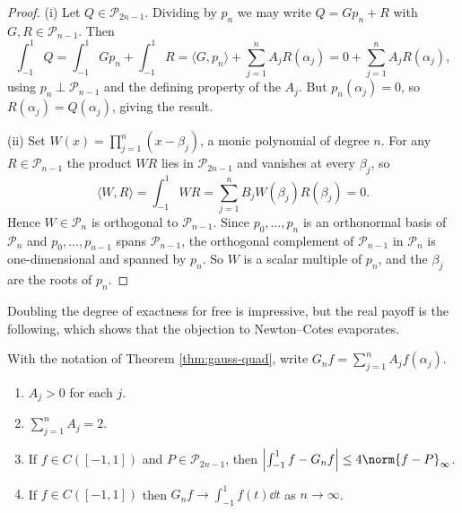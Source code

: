 \documentclass[a4paper]{scrartcl}
\newcommand{\Pn}{\mathcal{P}}
\begin{document}
\begin{proof}
	(i) Let $Q\in\Pn_{2n-1}$. Dividing by $p_n$ we may write $Q = Gp_n + R$ with $G,R\in\Pn_{n-1}$. Then
	$$\int_{-1}^1 Q = \int_{-1}^1 Gp_n + \int_{-1}^1 R = \langle G,p_n\rangle + \sum_{j=1}^n A_jR(\alpha_j) = 0 + \sum_{j=1}^n A_jR(\alpha_j),$$
	using $p_n\perp\Pn_{n-1}$ and the defining property of the $A_j$. But $p_n(\alpha_j)=0$, so $R(\alpha_j) = Q(\alpha_j)$, giving the result.

	(ii) Set $W(x) = \prod_{j=1}^n(x-\beta_j)$, a monic polynomial of degree $n$. For any $R\in\Pn_{n-1}$ the product $WR$ lies in $\Pn_{2n-1}$ and vanishes at every $\beta_j$, so
	$$\langle W,R\rangle = \int_{-1}^1 W R = \sum_{j=1}^n B_jW(\beta_j)R(\beta_j) = 0.$$
	Hence $W \in\Pn_n$ is orthogonal to $\Pn_{n-1}$. Since $p_0,\ldots,p_n$ is an orthonormal basis of $\Pn_n$ and $p_0,\ldots,p_{n-1}$ spans $\Pn_{n-1}$, the orthogonal complement of $\Pn_{n-1}$ in $\Pn_n$ is one-dimensional and spanned by $p_n$. So $W$ is a scalar multiple of $p_n$, and the $\beta_j$ are the roots of $p_n$.
\end{proof}

Doubling the degree of exactness for free is impressive, but the real payoff is the following, which shows that the objection to Newton--Cotes evaporates.

\begin{theorem}\label{thm:gauss-good}
	With the notation of Theorem \ref{thm:gauss-quad}, write $G_nf = \sum_{j=1}^nA_jf(\alpha_j)$.
	\begin{enumerate}[label=(\roman*)]
		\item $A_j > 0$ for each $j$.
		\item $\sum_{j=1}^n A_j = 2$.
		\item If $f \in C([-1,1])$ and $P\in\Pn_{2n-1}$, then $\left|\int_{-1}^1 f - G_nf\right| \leq 4\norm{f-P}_\infty$.
		\item If $f\in C([-1,1])$ then $G_nf \to \int_{-1}^1 f(t)\dd t$ as $n\to\infty$.
	\end{enumerate}
\end{theorem}
\end{document}
